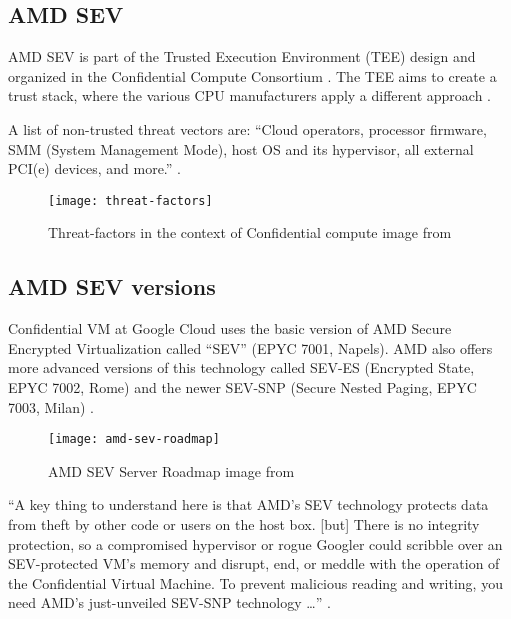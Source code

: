\subsection{AMD SEV}
AMD SEV is part of the Trusted Execution Environment (TEE) design 
and organized in the Confidential Compute Consortium 
\citep{foundation_members_2020}. 
The TEE aims to create a trust stack, 
where the various CPU manufacturers apply a different approach 
\citep{eckert_kick-off_2020,kohlbrenner_building_2020}. 

A list of non-trusted threat vectors are: 
“Cloud operators, processor firmware, SMM (System Management Mode), 
host OS and its hypervisor, all external PCI(e) devices, and more.” 
\citep{chamarthy_challenges_2020}.

\begin{figure}[!ht]
    \centering
    \texttt{[image: threat-factors]}
    \caption{Threat-factors in the context of Confidential compute 
    image from \cite{kohlbrenner_building_2020}}
    \label{fig:threat-factors}
\end{figure}


\subsection{AMD SEV versions}
Confidential VM at Google Cloud uses the basic version of 
AMD Secure Encrypted Virtualization called “SEV” (EPYC 7001, Napels). 
AMD also offers more advanced versions of this technology called 
SEV-ES (Encrypted State, EPYC 7002, Rome) 
and the newer SEV-SNP (Secure Nested Paging, EPYC 7003, Milan)
\citep{cutress_amd_2021,wikichip_contributors_epyc_2021,kennedy_google_2020}.

\begin{figure}[!ht]
    \centering
    \texttt{[image: amd-sev-roadmap]}
    \caption{AMD SEV Server Roadmap image from \cite{razavidinani_amd_2021}}
    \label{fig:amd-sev-roadmap}
\end{figure}


“A key thing to understand here is that AMD's SEV technology 
protects data from theft by other code or users on the host box. 
[but]
There is no integrity protection, 
so a compromised hypervisor or rogue Googler could scribble over 
an SEV-protected VM's memory and disrupt, end, or meddle 
with the operation of the Confidential Virtual Machine. 
To prevent malicious reading and writing, 
you need AMD's just-unveiled SEV-SNP technology …” 
\citep{nichols_match_2020,mms_securing_2015}.

